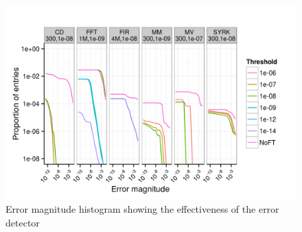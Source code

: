 \documentclass{sig-alternate}
\begin{document}
{\begin{figure}[ht!]
\centering
\includegraphics[width=1.00\columnwidth]{figs/4_1_1_Exp2_1_Example.png}
\caption{Error magnitude histogram showing the effectiveness of the error detector}
\label{fig:algo_err_dist}
\end{figure}

}
\end{document}
